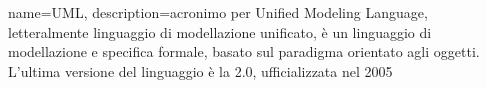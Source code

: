 

{
	name=UML,
	description={acronimo per Unified Modeling Language, letteralmente linguaggio di modellazione unificato, è un linguaggio di modellazione e specifica formale, basato sul paradigma orientato agli oggetti. L'ultima versione del linguaggio è la 2.0, ufficializzata nel 2005}
}